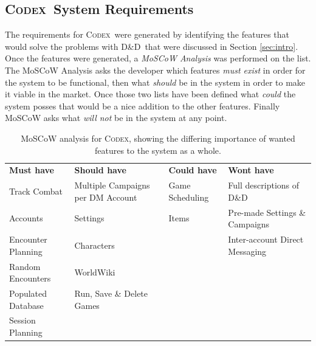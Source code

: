 \documentclass[progress]{cmpreport}
\newcommand{\dnd}{D\&D}
\newcommand{\Codex}{\textsc{Codex}}
\begin{document}
		\subsection{\Codex \ System Requirements}
		The requirements for \Codex \ were generated by identifying the features that would solve the problems with \dnd \ that were discussed in Section \ref{sec:intro}. Once the features were generated, a \emph{MoSCoW Analysis} was performed on the list. The MoSCoW Analysis asks the developer which features \emph{must exist} in order for the system to be functional, then what \emph{should} be in the system in order to make it viable in the market. Once those two lists have been defined what \emph{could} the system posses that would be a nice addition to the other features. Finally MoSCoW asks what \emph{will not} be in the system at any point.
		\begin{landscape}
			\begin{table}
				\centering
				\caption{MoSCoW analysis for \Codex, showing the differing importance of wanted features to the system as a whole.}
				\label{tab:MoSCoW}
				\begin{tabular}{|l|l|l|l|}
					\hline
					\textbf{Must have} 					& \textbf{Should have}              & \textbf{Could have} & \textbf{Wont have}             \\ \hhline{|=|=|=|=|}
					Track Combat      					& Multiple Campaigns per DM Account	& Game Scheduling     & Full descriptions of D\&D      \\ \hline
					Accounts          					& Settings							& Items               & Pre-made Settings \& Campaigns \\ \hline
					Encounter Planning 					& Characters                        &                     & Inter-account Direct Messaging \\ \hline
					Random Encounters  					& WorldWiki                        	&                     &                                \\ \hline
					Populated Database 					& Run, Save \& Delete Games 		&                     &                                \\ \hline
					Session Planning					&         							&                     &                                \\ \hline
				\end{tabular}
			\end{table}
		\end{landscape}
	
\end{document}
